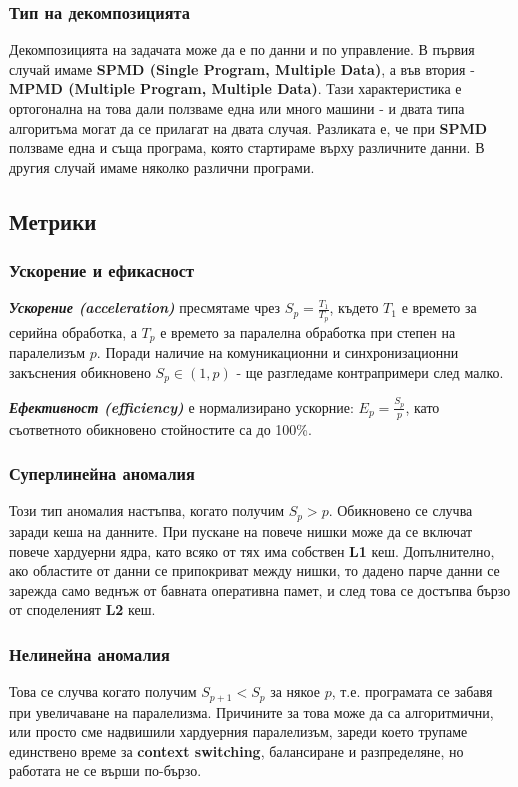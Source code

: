\documentclass[fleqn,12pt]{article}
\begin{document}
\subsubsection{Тип на декомпозицията}
Декомпозицията на задачата може да е по данни и по управление. В първия случай имаме \textbf{SPMD (Single Program, Multiple Data)}, а
във втория - \textbf{MPMD (Multiple Program, Multiple Data)}. Тази характеристика е ортогонална на това дали ползваме една или много машини 
- и двата типа алгоритъма могат да се прилагат на двата случая. Разликата е, че при \textbf{SPMD} ползваме една и съща програма, 
която стартираме върху различните данни. В другия случай имаме няколко различни програми.

\subsection{Метрики}
\subsubsection{Ускорение и ефикасност}
\textbf{\textit{Ускорение (acceleration)}} пресмятаме чрез $S_p = \frac{T_1}{T_p}$, където $T_1$ е времето за серийна обработка, а $T_p$ е времето за паралелна обработка при степен на паралелизъм $p$.
Поради наличие на комуникационни и синхронизационни закъснения обикновено $S_p \in (1, p)$ - ще разгледаме контрапримери след малко.

\textbf{\textit{Ефективност (efficiency)}} е нормализирано ускорние: $E_p = \frac{S_p}{p}$, като съответното обикновено стойностите са до 100\%.

\subsubsection{Суперлинейна аномалия}
Този тип аномалия настъпва, когато получим $S_p > p$. Обикновено се случва заради кеша на данните.
При пускане на повече нишки може да се включат повече хардуерни ядра, като всяко от тях има собствен \textbf{L1} кеш.
Допълнително, ако областите от данни се припокриват между нишки, то дадено парче данни се зарежда само веднъж от 
бавната оперативна памет, и след това се достъпва бързо от споделеният \textbf{L2} кеш.

\subsubsection{Нелинейна аномалия}
Това се случва когато получим $S_{p+1} < S_p$ за някое $p$, т.е. програмата се забавя при увеличаване на паралелизма.
Причините за това може да са алгоритмични, или просто сме надвишили хардуерния паралелизъм, зареди което трупаме единствено
време за \textbf{context switching}, балансиране и разпределяне, но работата не се върши по-бързо.
\end{document}
